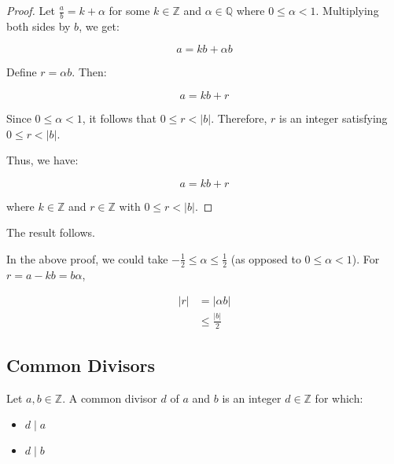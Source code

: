 \documentclass[11pt]{article}
\begin{document}
\begin{proof}
    Let \( \frac{a}{b} = k + \alpha \) for some \( k \in \mathbb{Z} \) and \( \alpha \in \mathbb{Q} \) where \( 0 \leq \alpha < 1 \). Multiplying both sides by \( b \), we get:

    \[ a = kb + \alpha b \]

    Define \( r = \alpha b \). Then:

    \[ a = kb + r \]

    Since \( 0 \leq \alpha < 1 \), it follows that \( 0 \leq r < |b| \). Therefore,
    \( r \) is an integer satisfying \( 0 \leq r < |b| \).

    Thus, we have:

    \[ a = kb + r \]

    where \( k \in \mathbb{Z} \) and \( r \in \mathbb{Z} \) with \( 0 \leq r < |b|
    \).

\end{proof}
The result follows.

\begin{remark} In the above proof, we could take \(-\frac{1}{2} \leq \alpha \leq \frac{1}{2}\) (as opposed to \(0 \leq \alpha < 1\)). For \(r = a - kb = b\alpha\),

    \[
        \begin{aligned}
            |r| & = |\alpha b|       \\
                & \leq \frac{|b|}{2}
        \end{aligned}
    \]
\end{remark}
\subsection{Common Divisors}
\begin{definition}
    Let \(a, b \in \mathbb{Z}\). A common divisor \(d\) of \(a\) and \(b\) is an integer \(d \in \mathbb{Z}\) for which:
    \begin{itemize}
        \item \(d \mid a\)
        \item \(d \mid b\)
    \end{itemize}
\end{definition}
\end{document}
